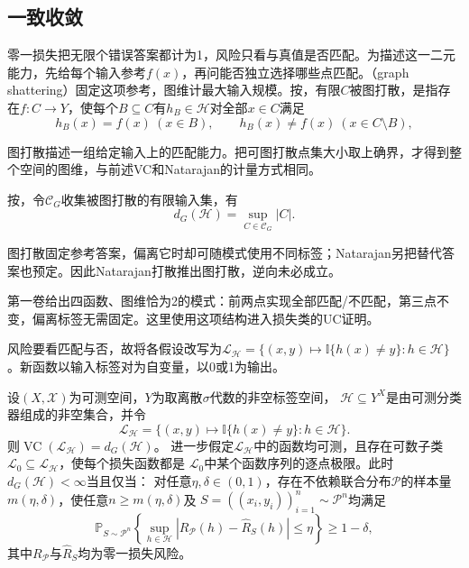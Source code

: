 \subsection{一致收敛}

零一损失把无限个错误答案都计为1，风险只看与真值是否匹配。为描述这一二元能力，先给每个输入参考$f(x)$，再问能否独立选择哪些点匹配。（graph shattering）固定这项参考，图维计最大输入规模。按，有限$C$被图打散，是指存在$f:C\to Y$，使每个$B\subseteq C$有$h_B\in\mathcal H$对全部$x\in C$满足
\[
 h_B(x)=f(x)\ (x\in B),\qquad h_B(x)\neq f(x)\ (x\in C\setminus B),
\]

图打散描述一组给定输入上的匹配能力。把可图打散点集大小取上确界，才得到整个空间的图维，与前述VC和Natarajan的计量方式相同。

按，令$\mathcal C_G$收集被图打散的有限输入集，有
\[
 d_G(\mathcal H)=\sup_{C\in\mathcal C_G}|C|.
\]

图打散固定参考答案，偏离它时却可随模式使用不同标签；Natarajan另把替代答案也预定。因此Natarajan打散推出图打散，逆向未必成立。

第一卷给出四函数、图维恰为2的模式：前两点实现全部匹配/不匹配，第三点不变，偏离标签无需固定。这里使用这项结构进入损失类的UC证明。

风险要看匹配与否，故将各假设改写为$\mathcal L_{\mathcal H}=\{(x,y)\mapsto\mathbb I\{h(x)\neq y\}:h\in\mathcal H\}$。新函数以输入标签对为自变量，以0或1为输出。

\begin{theorem}[图维与一致收敛]
\label{thm:graph-uniform-convergence}
设$(X,\mathcal X)$为可测空间，$Y$为取离散$\sigma$代数的非空标签空间，
$\mathcal H\subseteq Y^X$是由可测分类器组成的非空集合，并令
\[
 \mathcal L_{\mathcal H}
 =\{(x,y)\mapsto\mathbb I\{h(x)\neq y\}:h\in\mathcal H\}.
\]
则$\operatorname{VC}(\mathcal L_{\mathcal H})=d_G(\mathcal H)$。
进一步假定$\mathcal L_{\mathcal H}$中的函数均可测，且存在可数子类
$\mathcal L_0\subseteq\mathcal L_{\mathcal H}$，使每个损失函数都是
$\mathcal L_0$中某个函数序列的逐点极限。此时$d_G(\mathcal H)<\infty$当且仅当：
对任意$\eta,\delta\in(0,1)$，存在不依赖联合分布$\mathcal P$的样本量
$m(\eta,\delta)$，使任意$n\geq m(\eta,\delta)$及
$S=((x_i,y_i))_{i=1}^n\sim\mathcal P^n$均满足
\[
 \mathbb P_{S\sim\mathcal P^n}\left\{
 \sup_{h\in\mathcal H}|R_{\mathcal P}(h)-\hat R_S(h)|\leq\eta
 \right\}\geq1-\delta,
\]
其中$R_{\mathcal P}$与$\hat R_S$均为零一损失风险。
\end{theorem}

